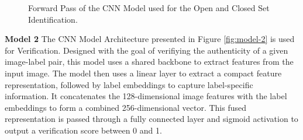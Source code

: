 \begin{figure}[ht!]
    \caption{Forward Pass of the CNN Model used for the Open and Closed Set Identification.}
    \label{fig:model-1}
\end{figure}

\textbf{Model 2} The CNN Model Architecture presented in Figure \ref{fig:model-2} is used for Verification. Designed with the goal of verifiying the authenticity of a given image-label pair, this model uses a shared backbone to extract features from the input image. The model then uses a linear layer to extract a compact feature representation, followed by label embeddings to capture label-specific information. It concatenates the 128-dimensional image features with the label embeddings to form a combined 256-dimensional vector. This fused representation is passed through a fully connected layer and sigmoid activation to output a verification score between 0 and 1.

